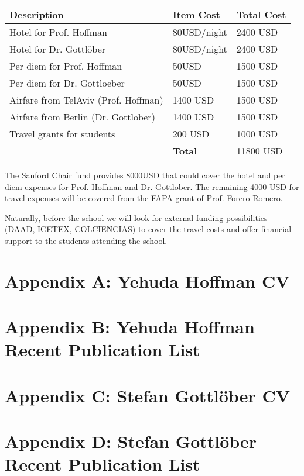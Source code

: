 \documentclass[12pt]{article}
\begin{document}
\begin{tabular}{lll}\hline
Description & Item Cost & Total Cost \\\hline
Hotel for Prof. Hoffman & 80USD/night & 2400 USD\\
Hotel for Dr. Gottl\"ober & 80USD/night & 2400 USD\\
Per diem for Prof. Hoffman & 50USD  & 1500 USD\\
Per diem for Dr. Gottloeber & 50USD & 1500 USD \\
Airfare from TelAviv (Prof. Hoffman) & 1400 USD & 1500 USD\\
Airfare from Berlin (Dr. Gottlober) & 1400 USD & 1500 USD\\
Travel grants for students & 200 USD & 1000 USD\\\hline
 & {\bf Total} & 11800 USD\\\hline
\end{tabular}

\vspace{1cm}

The Sanford Chair fund provides 8000USD that could cover the hotel and
per diem expenses for Prof. Hoffman and Dr. Gottlober. The remaining
4000 USD for travel expenses will be covered from the FAPA grant of
Prof. Forero-Romero. 



Naturally, before the school we will look for external funding
possibilities (DAAD, ICETEX, COLCIENCIAS) to cover the travel costs
and offer financial support to the students attending the school.

\newpage
\section*{Appendix A: Yehuda Hoffman CV} 

\newpage
\section*{Appendix B: Yehuda Hoffman Recent Publication List} 

\newpage
\section*{Appendix C: Stefan Gottl\"ober CV} 

\newpage
\section*{Appendix D: Stefan Gottl\"ober Recent Publication List} 
\end{document}
